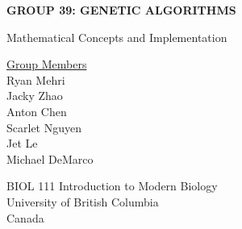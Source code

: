 \documentclass[letterpaper, reqno,11pt]{article}
\begin{document}

\begin{titlepage}
    \begin{center}
        \vspace*{8cm}
 
        \Huge
        \textbf{GROUP 39: GENETIC ALGORITHMS}
        
        \vspace{0.5cm}
        \LARGE
        Mathematical Concepts and Implementation
 
        \vspace{1.5cm}
 
        \vspace{0.5cm}
        \LARGE
 
 
        \vfill
 
       \underline {Group Members}\\
       \vspace{0.5cm}
        Ryan Mehri\\
        Jacky Zhao\\
        Anton Chen\\
        Scarlet Nguyen\\
        Jet Le\\
        Michael DeMarco
 
        \vspace{0.8cm}
 
 
        \Large
        BIOL 111 Introduction to Modern Biology\\
        University of British Columbia\\
        Canada\\
 
    \end{center}
\end{titlepage}






\end{document}
